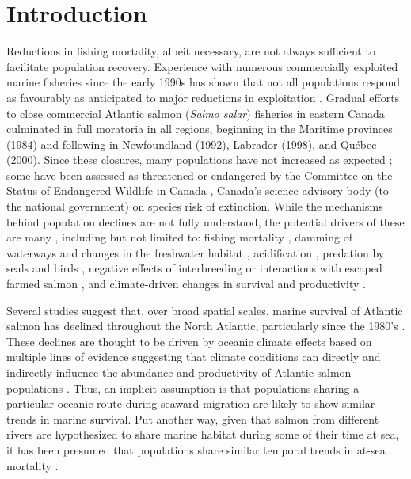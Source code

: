 \documentclass[12pt]{article}
\begin{document}

\section*{Introduction} %


Reductions in fishing mortality, albeit necessary, are not always sufficient
to facilitate population recovery. Experience with numerous commercially
exploited marine fisheries since the early 1990s has shown that not all
populations respond as favourably as anticipated to major reductions in
exploitation \citep{Hutchings2017}. Gradual efforts to close commercial
Atlantic salmon (\emph{Salmo salar}) fisheries in eastern Canada culminated in
full moratoria in all regions, beginning in the Maritime provinces (1984) and
following in Newfoundland (1992), Labrador (1998), and Qu\'{e}bec (2000). Since
these closures, many populations have not increased as 
expected \citep{Dempson2004, ICES2019}; some 
have been assessed as threatened or endangered by the 
Committee on the Status of Endangered Wildlife in Canada \citep[][]{Cosewic2010}, 
Canada's science advisory body (to the national government) on
species risk of extinction.
While the mechanisms behind population declines are not fully understood, the potential
drivers of these are many \citep[see ][for a detailed discussion of possible
causes]{Cairns2001}, including but not limited to: fishing mortality \citep{Dempson2004}, 
damming of waterways and changes in the freshwater habitat \citep{Dunfield1985,Clarke2014a}, 
acidification \citep[particularly in Nova Scotia's Southern Uplands, see][]{Gibson2010}, 
predation by seals and birds \citep{Cairns2000}, negative
effects of interbreeding or interactions with escaped farmed salmon
\citep{Keyser2018}, and climate-driven changes in survival and productivity \citep{Mills2013}.

Several studies suggest that, over broad spatial scales,
marine survival of Atlantic salmon has declined throughout the North Atlantic,
particularly since the 1980's \citep{Massiot-Granier2014,ICES2019,Olmos2019}.
These declines are thought to be driven by oceanic climate effects 
based on multiple lines of evidence suggesting that climate conditions can directly and
indirectly influence the abundance and productivity of Atlantic salmon
populations \citep{Mills2013,Almodovar2019,Olmos2020}.
Thus, an implicit assumption is that populations sharing a particular oceanic
route during seaward migration are likely to show similar trends in marine
survival. 
Put another way, given that salmon from different rivers 
are hypothesized to share marine habitat during some of their time at sea, it
has been presumed that populations share similar temporal trends in
at-sea mortality \citep{Friedland1993, Friedland1998, Russell2012}.  
\end{document}
